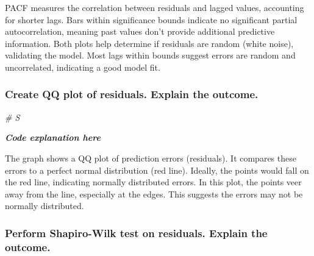 \documentclass[
]{book}
\newenvironment{Shaded}{\begin{snugshade}}{\end{snugshade}}
\newcommand{\CommentTok}[1]{\textcolor[rgb]{0.56,0.35,0.01}{\textit{#1}}}
\newcommand{\FunctionTok}[1]{\textcolor[rgb]{0.13,0.29,0.53}{\textbf{#1}}}
\newcommand{\NormalTok}[1]{#1}
\newcommand{\OtherTok}[1]{\textcolor[rgb]{0.56,0.35,0.01}{#1}}
\newcommand{\SpecialCharTok}[1]{\textcolor[rgb]{0.81,0.36,0.00}{\textbf{#1}}}
\begin{document}
PACF measures the correlation between residuals and lagged values, accounting for shorter lags. Bars within significance bounds indicate no significant partial autocorrelation, meaning past values don't provide additional predictive information.
Both plots help determine if residuals are random (white noise), validating the model. Most lags within bounds suggest errors are random and uncorrelated, indicating a good model fit.

\subsubsection{Create QQ plot of residuals. Explain the outcome.}\label{create-qq-plot-of-residuals.-explain-the-outcome.}

\begin{Shaded}
\begin{Highlighting}[]
  \CommentTok{\# S}
\end{Highlighting}
\end{Shaded}

\emph{\textbf{Code explanation here}}

The graph shows a QQ plot of prediction errors (residuals). It compares these errors to a perfect normal distribution (red line). Ideally, the points would fall on the red line, indicating normally distributed errors. In this plot, the points veer away from the line, especially at the edges. This suggests the errors may not be normally distributed.

\subsubsection{Perform Shapiro-Wilk test on residuals. Explain the outcome.}\label{perform-shapiro-wilk-test-on-residuals.-explain-the-outcome.}

\begin{Shaded}
\end{Shaded}
\end{document}
